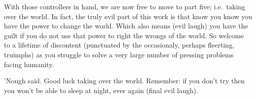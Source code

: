 With those controllers in hand, we are now free to move to part five;
i.e.~taking over the world. In fact, the truly evil part of this work is
that know you know you have the power to change the world. Which also
means (evil laugh) you have the guilt if you do not use that power to
right the wrongs of the world. So welcome to a lifetime of discontent
(punctuated by the occasionaly, perhaps fleerting, truimphs) as you
struggle to solve a very large number of pressing problems facing
humanity.

'Nough said. Good luck taking over the world. Remember: if you don't try
then you won't be able to sleep at night, ever again (final evil laugh).
